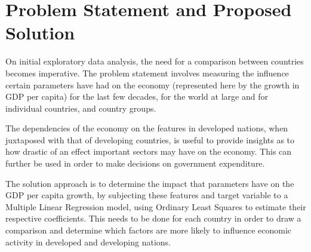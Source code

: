 \documentclass[conference]{IEEEtran}
\begin{document}

\section{Problem Statement and Proposed Solution}

On initial exploratory data analysis, the need for a comparison between countries becomes imperative. The problem statement involves measuring the influence certain parameters have had on the economy (represented here by the growth in GDP per capita) for the last few decades, for the world at large and for individual countries, and country groups. 

The dependencies of the economy on the features in developed nations, when juxtaposed with that of developing countries, is useful to provide insights as to how drastic of an effect important sectors may have on the economy. This can further be used in order to make decisions on government expenditure. 

The solution approach is to determine the impact that  parameters have on the GDP per capita growth, by subjecting these features and target variable to a Multiple Linear Regression model, using Ordinary Least Squares to estimate their respective coefficients. This needs to be done for each country in order to draw a comparison and determine which factors are more likely to influence economic activity in developed and developing nations. 
\end{document}
